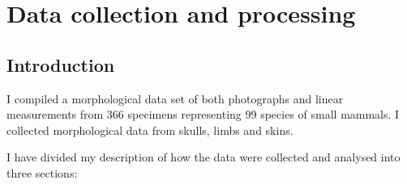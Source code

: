 
\chapter{Data collection and processing}
\label{chap:methods}


\section{Introduction} %

	I compiled a morphological data set of both photographs and linear measurements from 366 specimens representing 99 species of small mammals. 
	I collected morphological data from skulls, limbs and skins. 
    
	
	I have divided my description of how the data were collected and analysed %
	into three sections:
	
